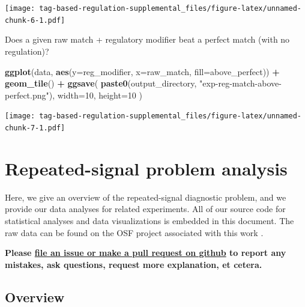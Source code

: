 \documentclass[
]{book}
\newenvironment{Shaded}{\begin{snugshade}}{\end{snugshade}}
\newcommand{\DataTypeTok}[1]{\textcolor[rgb]{0.13,0.29,0.53}{#1}}
\newcommand{\DecValTok}[1]{\textcolor[rgb]{0.00,0.00,0.81}{#1}}
\newcommand{\KeywordTok}[1]{\textcolor[rgb]{0.13,0.29,0.53}{\textbf{#1}}}
\newcommand{\NormalTok}[1]{#1}
\newcommand{\OperatorTok}[1]{\textcolor[rgb]{0.81,0.36,0.00}{\textbf{#1}}}
\newcommand{\StringTok}[1]{\textcolor[rgb]{0.31,0.60,0.02}{#1}}
\begin{document}
\texttt{[image: tag-based-regulation-supplemental\_files/figure-latex/unnamed-chunk-6-1.pdf]}

Does a given raw match + regulatory modifier beat a perfect match (with no regulation)?

\begin{Shaded}
\begin{Highlighting}[]
\KeywordTok{ggplot}\NormalTok{(data, }\KeywordTok{aes}\NormalTok{(}\DataTypeTok{y=}\NormalTok{reg\_modifier, }\DataTypeTok{x=}\NormalTok{raw\_match, }\DataTypeTok{fill=}\NormalTok{above\_perfect)) }\OperatorTok{+}
\StringTok{  }\KeywordTok{geom\_tile}\NormalTok{() }\OperatorTok{+}
\StringTok{  }\KeywordTok{ggsave}\NormalTok{(}
    \KeywordTok{paste0}\NormalTok{(output\_directory, }\StringTok{"exp{-}reg{-}match{-}above{-}perfect.png"}\NormalTok{),}
    \DataTypeTok{width=}\DecValTok{10}\NormalTok{,}
    \DataTypeTok{height=}\DecValTok{10}
\NormalTok{  )}
\end{Highlighting}
\end{Shaded}

\texttt{[image: tag-based-regulation-supplemental\_files/figure-latex/unnamed-chunk-7-1.pdf]}

\hypertarget{repeated-signal-problem-analysis}{%
\chapter{Repeated-signal problem analysis}\label{repeated-signal-problem-analysis}}

Here, we give an overview of the repeated-signal diagnostic problem, and we provide our data analyses for related experiments.
All of our source code for statistical analyses and data visualizations is embedded in this document.
The raw data can be found on the OSF project associated with this work \citep{Lalejini_Moreno_Ofria_Data_2020}.

\textbf{Please \href{https://github.com/amlalejini/Tag-based-Genetic-Regulation-for-LinearGP/issues}{file an issue or make a pull request on github} to report any mistakes, ask questions, request more explanation, et cetera.}

\hypertarget{overview}{%
\section{Overview}\label{overview}}
\end{document}
